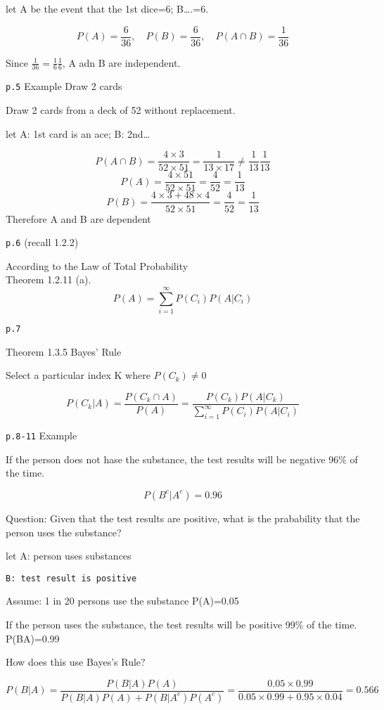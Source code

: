 \documentclass[]{tufte-book}
\begin{document}
let A be the event that the 1st dice=6; B\ldots{}.=6.

\[P(A)=\frac6{36},\quad P(B)=\frac6{36},\quad P(A\cap B)=\frac1{36}\]

Since \(\frac1{36}=\frac16\frac16\), A adn B are independent.

\texttt{p.5} Example Draw 2 cards

Draw 2 cards from a deck of 52 without replacement.

let A: 1st card is an ace; B: 2nd\ldots{}

\[P(A\cap B)=\frac{4\times 3}{52\times 51}=\frac1{13\times 17}\ne\frac1{13}\frac1{13}\]
\[P(A)=\frac{4\times 51}{52\times 51}=\frac4{52}=\frac1{13}\]
\[P(B)=\frac{4\times 3+48\times 4}{52\times 51}=\frac4{52}=\frac1{13}\]
Therefore A and B are dependent

\texttt{p.6} (recall 1.2.2)

According to the Law of Total Probability\\
Theorem 1.2.11 (a).\\
\[P(A)=\sum_{i=1}^\infty{P(C_i)}P(A|C_i)\]

\texttt{p.7}

Theorem 1.3.5 Bayes' Rule

Select a particular index K where \(P(C_k)\ne0\)

\[P(C_k|A)=\frac{P(C_k\cap A)}{P(A)}=\frac{P(C_k)P(A|C_k) }{\sum_{i=1}^\infty{P(C_i)}P(A|C_i)}\]

\texttt{p.8-11} Example

If the person does not hase the substance, the test results will be
negative 96\% of the time.

\[P(B^c|A^c)=0.96\]

Question: Given that the test results are positive, what is the
prabability that the person uses the substance?

let A: person uses substances

\begin{verbatim}
B: test result is positive
\end{verbatim}

Assume: 1 in 20 persons use the substance P(A)=0.05

If the person uses the substance, the test results will be positive 99\%
of the time. P(B\textbar{}A)=0.99

How does this use Bayes's Rule?

\[P(B|A)=\frac{P(B|A)P(A)}{P(B|A)P(A)+P(B|A^c)P(A^c)}=\frac{0.05\times 0.99}{0.05\times0.99+0.95\times0.04}=0.566 \]
\end{document}
